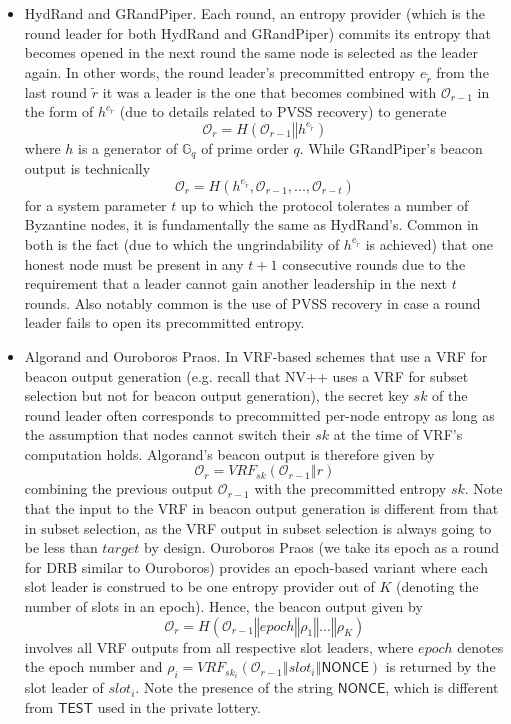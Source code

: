 \documentclass[letterpaper,twocolumn,10pt]{article}
\theoremstyle{definition}
\theoremstyle{remark}
\begin{document}
\begin{itemize}
\item HydRand and GRandPiper. Each round, an entropy provider (which is the round leader for both HydRand and GRandPiper) commits its entropy that becomes opened in the next round the same node is selected as the leader again. In other words, the round leader's precommitted entropy $e_{\tilde{r}}$ from the last round $\tilde{r}$ it was a leader is the one that becomes combined with $\mathcal{O}_{r - 1}$ in the form of $h^{e_{\tilde{r}}}$ (due to details related to PVSS recovery) to generate
\[
\mathcal{O}_r = H(\mathcal{O}_{r - 1} \mathbin\Vert h^{e_{\tilde{r}}})
\]
where $h$ is a generator of $\mathbb{G}_q$ of prime order $q$. While GRandPiper's beacon output is technically
\[
\mathcal{O}_r = H(h^{e_{\tilde{r}}}, \mathcal{O}_{r - 1}, ..., \mathcal{O}_{r - t})
\]
for a system parameter $t$ up to which the protocol tolerates a number of Byzantine nodes, it is fundamentally the same as HydRand's. Common in both is the fact (due to which the ungrindability of $h^{e_{\tilde{r}}}$ is achieved) that one honest node must be present in any $t + 1$ consecutive rounds due to the requirement that a leader cannot gain another leadership in the next $t$ rounds. Also notably common is the use of PVSS recovery in case a round leader fails to open its precommitted entropy.
\item Algorand and Ouroboros Praos. In VRF-based schemes that use a VRF for beacon output generation (e.g. recall that NV++ uses a VRF for subset selection but not for beacon output generation), the secret key $sk$ of the round leader often corresponds to precommitted per-node entropy as long as the assumption that nodes cannot switch their $sk$ at the time of VRF's computation holds. Algorand's beacon output is therefore given by
\[
\mathcal{O}_r = VRF_{sk}(\mathcal{O}_{r - 1} \mathbin\Vert r)
\]
combining the previous output $\mathcal{O}_{r - 1}$ with the precommitted entropy $sk$. Note that the input to the VRF in beacon output generation is different from that in subset selection, as the VRF output in subset selection is always going to be less than $target$ by design. Ouroboros Praos (we take its epoch as a round for DRB similar to Ouroboros) provides an epoch-based variant where each slot leader is construed to be one entropy provider out of $K$ (denoting the number of slots in an epoch). Hence, the beacon output given by
\[
\mathcal{O}_r = H(\mathcal{O}_{r - 1} \mathbin\Vert epoch \mathbin\Vert \rho_1 \mathbin\Vert ... \mathbin\Vert \rho_K)
\]
involves all VRF outputs from all respective slot leaders, where $epoch$ denotes the epoch number and $\rho_i = VRF_{sk_i}(\mathcal{O}_{r - 1} \mathbin\Vert slot_i \mathbin\Vert \mathsf{NONCE})$ is returned by the slot leader of $slot_i$. Note the presence of the string $\mathsf{NONCE}$, which is different from $\mathsf{TEST}$ used in the private lottery.

\end{itemize}
\end{document}
